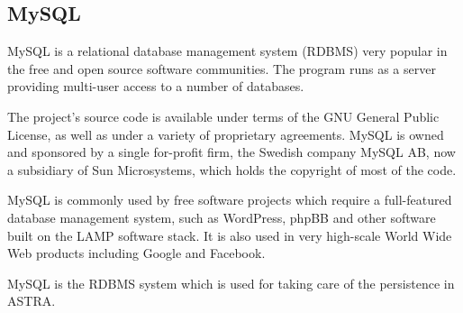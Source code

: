 \subsection{MySQL}
\label{subsec:tech-mysql}
MySQL is a relational database management system (RDBMS) very popular in the
free and open source software communities. The program runs as a server
providing multi-user access to a number of databases.

The project's source code is available under terms of the GNU General Public 
License, as well as under a variety of proprietary agreements. MySQL is owned 
and sponsored by a single for-profit firm, the Swedish company MySQL AB, now  a
subsidiary of Sun Microsystems, which holds the copyright of most of the code.

MySQL is commonly used by free software projects which require a full-featured
database management system, such as WordPress, phpBB and other software built 
on the LAMP software stack. It is also used in very high-scale World Wide Web 
products including Google and Facebook.

MySQL is the RDBMS system which is used for taking care of the persistence
in ASTRA.
